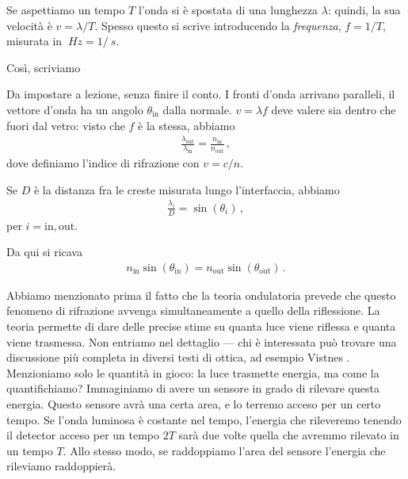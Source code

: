 \documentclass{article}
\begin{document}
Se aspettiamo un tempo \(T\) l'onda si è spostata di una lunghezza \(\lambda \): quindi, la sua velocità è \(v = \lambda / T\). Spesso questo si scrive introducendo la \emph{frequenza}, \(f = 1 / T\), misurata in \(\SI{}{Hz} = 1 / \SI{}{s}\).

Così, scriviamo 
%


\begin{exo}
Da impostare a lezione, senza finire il conto. 
I fronti d'onda arrivano paralleli, il vettore d'onda ha un angolo \(\theta _{\text{in}}\) dalla normale. \(v = \lambda f\) deve valere sia dentro che fuori dal vetro: visto che \(f\) è la stessa, abbiamo 
%
\begin{align}
    \frac{ \lambda _{\text{out}}}{\lambda _{\text{in}}} = \frac{n _{\text{in}}}{n _{\text{out}}}
    \,,
\end{align}
%
dove definiamo l'indice di rifrazione con \(v = c/n\). 
    
Se \(D\) è la distanza fra le creste misurata lungo l'interfaccia, abbiamo 
%
\begin{align}
    \frac{\lambda_{i}}{D} = \sin(\theta_{i})
    \,,
\end{align}
%
per \(i = \text{in}, \text{out}\). 

Da qui si ricava 
%
\begin{align}
n _{\text{in}} \sin(\theta _{\text{in}}) = 
n _{\text{out}} \sin(\theta _{\text{out}})
\,.
\end{align}
\end{exo}

Abbiamo menzionato prima il fatto che la teoria ondulatoria prevede che questo fenomeno di rifrazione avvenga simultaneamente a quello della riflessione. 
La teoria permette di dare delle precise stime su quanta luce viene riflessa e quanta viene trasmessa. Non entriamo nel dettaglio --- chi è interessata può trovare una discussione più completa in diversi testi di ottica, ad esempio Vistnes \cite[]{vistnesReflectionTransmissionPolarization2018}. Menzioniamo solo le quantità in gioco: la luce trasmette energia, ma come la quantifichiamo? 
Immaginiamo di avere un sensore in grado di rilevare questa energia. Questo sensore avrà una certa area, e lo terremo acceso per un certo tempo. 
Se l'onda luminosa è costante nel tempo, l'energia che rileveremo tenendo il detector acceso per un tempo \(2T\) sarà due volte quella che avremmo rilevato in un tempo \(T\). Allo stesso modo, se raddoppiamo l'area del sensore l'energia che rileviamo raddoppierà.
\end{document}
